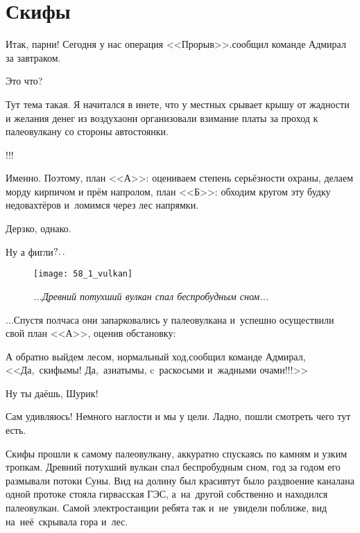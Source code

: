 \chapter{Скифы}
\vepsianrose

\diagdash Итак, парни! Сегодня у нас операция <<Прорыв>>.\mdash сообщил команде Адмирал за завтраком.

\diagdash Это что?

\diagdash Тут тема такая. Я начитался в инете, что у местных срывает крышу от жадности и желания денег из воздуха\mdash они организовали взимание платы за проход к палеовулкану со стороны автостоянки.

\diagdash !!!

\diagdash Именно. Поэтому, план <<А>>: оцениваем степень серьёзности охраны, делаем морду кирпичом и прём напролом, план <<Б>>: обходим кругом эту будку недовахтёров и~ломимся через лес напрямки.

\diagdash Дерзко, однако.

\diagdash Ну а фигли$\mathpunct{?\ldotp\ldotp}$ %

\newpage

\begin{figure}[h]
	\centering
	\texttt{[image: 58\_1\_vulkan]}
	\caption{\small\textit{...Древний потухший вулкан спал беспробудным сном...}}
\end{figure}

$\ldots$Спустя полчаса они запарковались у палеовулкана и~успешно осуществили свой план <<А>>, оценив обстановку:

\diagdash А обратно выйдем лесом, нормальный ход,\mdash сообщил команде Адмирал,\mdash <<Да,~скифы\mdash мы! Да,~азиаты\mdash мы, c~раскосыми и~жадными очами!!!>>

\diagdash Ну ты даёшь, Шурик!

\diagdash Сам удивляюсь! Немного наглости и мы у цели. Ладно, пошли смотреть чего тут есть.

Скифы прошли к самому палеовулкану, аккуратно спускаясь по камням и узким тропкам. Древний потухший вулкан спал беспробудным сном, год за годом его размывали потоки Суны. Вид на долину был красив\mdash тут было раздвоение канала\mdash на одной протоке стояла гирвасская ГЭС, а~на~другой собственно и находился палеовулкан. Самой электростанции ребята так и~не~увидели поближе, вид на~неё~скрывала гора и~лес. 

